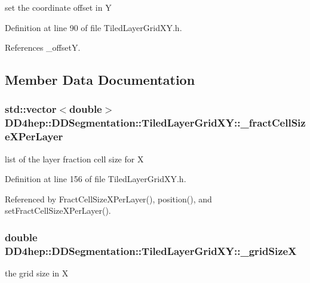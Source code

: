 set the coordinate offset in Y 

Definition at line 90 of file TiledLayerGridXY.h.

References \_\-offsetY.

\subsection{Member Data Documentation}
\hypertarget{class_d_d4hep_1_1_d_d_segmentation_1_1_tiled_layer_grid_x_y_a459d90c7d9a34184e093dd0ce01e5157}{
\subsubsection[{\_\-fractCellSizeXPerLayer}]{\setlength{\rightskip}{0pt plus 5cm}std::vector$<$double$>$ {\bf DD4hep::DDSegmentation::TiledLayerGridXY::\_\-fractCellSizeXPerLayer}}}
\label{class_d_d4hep_1_1_d_d_segmentation_1_1_tiled_layer_grid_x_y_a459d90c7d9a34184e093dd0ce01e5157}


list of the layer fraction cell size for X 

Definition at line 156 of file TiledLayerGridXY.h.

Referenced by FractCellSizeXPerLayer(), position(), and setFractCellSizeXPerLayer().\hypertarget{class_d_d4hep_1_1_d_d_segmentation_1_1_tiled_layer_grid_x_y_ab579117ca41778248009a661cbaa27b7}{
\subsubsection[{\_\-gridSizeX}]{\setlength{\rightskip}{0pt plus 5cm}double {\bf DD4hep::DDSegmentation::TiledLayerGridXY::\_\-gridSizeX}}}
\label{class_d_d4hep_1_1_d_d_segmentation_1_1_tiled_layer_grid_x_y_ab579117ca41778248009a661cbaa27b7}


the grid size in X 

